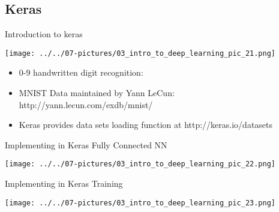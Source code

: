 \documentclass[11pt]{beamer}
\begin{document}
\subsection{Keras \\ \scalebox{0.8}{}}
\begin{frame}{Introduction to keras}
	\begin{center}
	\texttt{[image: ../../07-pictures/03\_intro\_to\_deep\_learning\_pic\_21.png]}
	\end{center}
	\begin{itemize}
		\item 0-9 handwritten digit recognition:
		\item MNIST Data maintained by Yann LeCun: http://yann.lecun.com/exdb/mnist/
		\item Keras provides data sets loading function at http://keras.io/datasets
	\end{itemize}
\end{frame}
\begin{frame}{Implementing in Keras}
	Fully Connected NN
	\begin{center}
	\texttt{[image: ../../07-pictures/03\_intro\_to\_deep\_learning\_pic\_22.png]}
	\end{center}
\end{frame}
\begin{frame}{Implementing in Keras}
	Training
	\begin{center}
	\texttt{[image: ../../07-pictures/03\_intro\_to\_deep\_learning\_pic\_23.png]}
	\end{center}
\end{frame}
\end{document}
